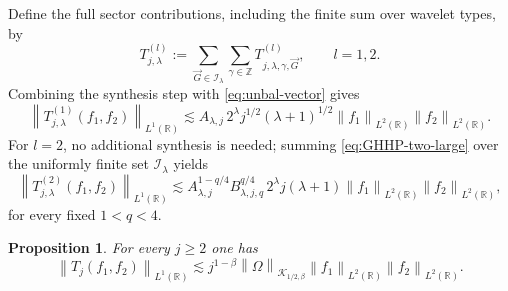 \documentclass[11pt]{amsart}
\newtheorem{proposition}[definition]{Proposition}
\theoremstyle{remark}
\numberwithin{equation}{section}
\newcommand{\R}{\mathbb R}
\newcommand{\cK}{\mathcal K}
\newcommand{\cI}{\mathcal I}
\newcommand{\norm}[1]{\left\lVert #1\right\rVert}
\begin{document}
	Define the full sector contributions, including the finite sum over wavelet
	types, by
	\[
	T_{j,\lambda}^{(l)}
	:=
	\sum_{\vec G\in\cI_\lambda}
	\sum_{\gamma\in\mathbb Z}
	T_{j,\lambda,\gamma,\vec G}^{(l)},
	\qquad l=1,2.
	\]
	Combining the synthesis step with \eqref{eq:unbal-vector} gives
	\begin{equation}
		\norm{T_{j,\lambda}^{(1)}(f_1,f_2)}_{L^1(\R)}
		\lesssim
		A_{\lambda,j}\,2^\lambda
		j^{1/2}(\lambda+1)^{1/2}
		\norm{f_1}_{L^2(\R)}\norm{f_2}_{L^2(\R)}.
		\label{eq:unbal-model}
	\end{equation}
	For \(l=2\), no additional synthesis is needed; summing
	\eqref{eq:GHHP-two-large} over the uniformly finite set
	\(\cI_\lambda\) yields
	\begin{equation}
		\norm{T_{j,\lambda}^{(2)}(f_1,f_2)}_{L^1(\R)}
		\lesssim
		A_{\lambda,j}^{1-q/4}B_{\lambda,j,q}^{q/4}
		\,2^\lambda j(\lambda+1)
		\norm{f_1}_{L^2(\R)}\norm{f_2}_{L^2(\R)},
		\label{eq:bal-model}
	\end{equation}
	for every fixed \(1<q<4\).
	
	\begin{proposition}\label{prop:L2-endpoint}
		For every \(j\ge2\) one has
		\[
		\norm{T_j(f_1,f_2)}_{L^1(\R)}
		\lesssim
		j^{1-\beta}\norm{\Omega}_{\cK_{1/2,\beta}}
		\norm{f_1}_{L^2(\R)}\norm{f_2}_{L^2(\R)}.
		\]
	\end{proposition}
	
\end{document}
